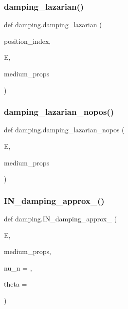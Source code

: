 \subsubsection{\texorpdfstring{damping\+\_\+lazarian()}{damping\_lazarian()}}
{\footnotesize\ttfamily def damping.\+damping\+\_\+lazarian (\begin{DoxyParamCaption}\item[{}]{position\+\_\+index,  }\item[{}]{E,  }\item[{}]{medium\+\_\+props }\end{DoxyParamCaption})}

\mbox{\label{namespacedamping_a8c8ec7b9696c1d5bff04d58cda14022d}} 
\subsubsection{\texorpdfstring{damping\+\_\+lazarian\+\_\+nopos()}{damping\_lazarian\_nopos()}}
{\footnotesize\ttfamily def damping.\+damping\+\_\+lazarian\+\_\+nopos (\begin{DoxyParamCaption}\item[{}]{E,  }\item[{}]{medium\+\_\+props }\end{DoxyParamCaption})}

\mbox{\label{namespacedamping_abddf89538f1bdc199479122581d6b2b1}} 
\subsubsection{\texorpdfstring{I\+N\+\_\+damping\+\_\+approx\+\_()}{IN\_damping\_approx\_1()}}
{\footnotesize\ttfamily def damping.\+I\+N\+\_\+damping\+\_\+approx\+\_ (\begin{DoxyParamCaption}\item[{}]{E,  }\item[{}]{medium\+\_\+props,  }\item[{}]{nu\+\_\+n = {},  }\item[{}]{theta = {} }\end{DoxyParamCaption})}

